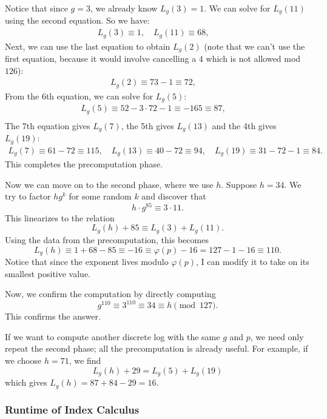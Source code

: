 \documentclass{article}
\theoremstyle{plain}
\theoremstyle{definition}
\theoremstyle{remark}
\numberwithin{theorem}{section}
\begin{document}
Notice that since $g=3$, we already know $L_g(3) = 1$.  We can solve for $L_g(11)$ using the second equation.  So we have:
\begin{gather*}
	L_g(3) \equiv 1, \quad
	L_g(11) \equiv 68, \quad
\end{gather*}
Next, we can use the last equation to obtain $L_g(2)$ (note that we can't use the first equation, because it would involve cancelling a $4$ which is not allowed mod $126$):
\begin{gather*}
	L_g(2) \equiv 73 - 1 \equiv 72, \quad
\end{gather*}
From the 6th equation, we can solve for $L_g(5)$:
\begin{gather*}
	L_g(5) \equiv 52-3 \cdot 72- 1 \equiv -165 \equiv 87, \quad \\
\end{gather*}
The 7th equation gives $L_g(7)$, the 5th gives $L_g(13)$ and the 4th gives $L_g(19)$:
\begin{gather*}
	L_g(7) \equiv 61 - 72 \equiv 115, \quad
	L_g(13) \equiv 40 - 72 \equiv 94, \quad
	L_g(19) \equiv 31 - 72 - 1 \equiv 84.
\end{gather*}
This completes the precomputation phase.

Now we can move on to the second phase, where we use $h$.  Suppose $h=34$.  We try to factor $hg^k$ for some random $k$ and discover that
\[
	h\cdot g^{85} \equiv 3 \cdot 11.
\]
This linearizes to the relation
\[
	L_g(h) + 85 \equiv L_g(3) + L_g(11).
\]
Using the data from the precomputation, this becomes
\[
	L_g(h) \equiv 1 + 68 - 85 \equiv -16 \equiv \varphi(p) - 16 = 127 - 1 -16 \equiv 110.
\]
Notice that since the exponent lives modulo $\varphi(p)$, I can modify it to take on its smallest positive value.

Now, we confirm the computation by directly computing
\[
	g^{110} \equiv 3^{110} \equiv 34 \equiv h \pmod{127}.
\]
This confirms the answer.

If we want to compute another discrete log with the same $g$ and $p$, we need only repeat the second phase; all the precomputation is already useful.  For example, if we choose $h=71$, we find
\[
	L_g(h) + 29 = L_g(5) + L_g(19)
\]
which gives $L_g(h) = 87 + 84 - 29  = 16$. 

\subsubsection{Runtime of Index Calculus}
\end{document}
